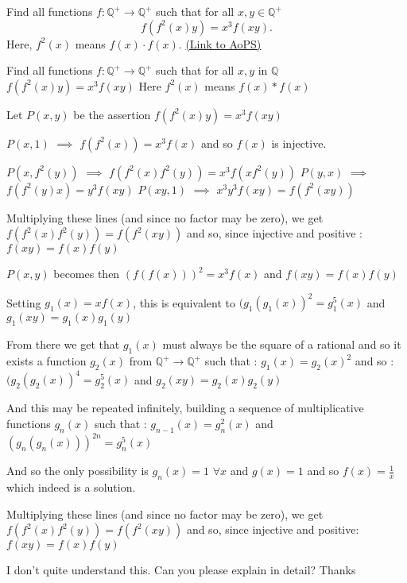 \begin{problem}
	Find all functions $f:\mathbb{Q}^{+}\to\mathbb{Q}^{+}$ such that for all $x,y \in \mathbb{Q}^+$
\[ f(f^{2}(x)y)=x^{3}f(xy).\]
Here, $ f^{2}(x) $ means $ f(x) \cdot f(x) $.
	\flushright \href{https://artofproblemsolving.com/community/c6h412941}{(Link to AoPS)}
\end{problem}



\begin{solution}
	\begin{tcolorbox}Find all functions $f:\mathbb{Q}^{+}\to\mathbb{Q}^{+}$ such that for all $x,y$ in $\mathbb{Q}$
$ f(f^{2}(x)y)=x^{3}f(xy) $
Here $ f^{2}(x) $ means $ f(x)*f(x) $\end{tcolorbox}
Let $P(x,y)$ be the assertion $f(f^2(x)y)=x^3f(xy)$

$P(x,1)$ $\implies$ $f(f^2(x))=x^3f(x)$ and so $f(x)$ is injective.

$P(x,f^2(y))$ $\implies$ $f(f^2(x)f^2(y))=x^3f(xf^2(y))$
$P(y,x)$ $\implies$ $f(f^2(y)x)=y^3f(xy)$
$P(xy,1)$ $\implies$ $x^3y^3f(xy)=f(f^2(xy))$

Multiplying these lines (and since no factor may be zero), we get $f(f^2(x)f^2(y))=f(f^2(xy))$ and so, since injective and positive :
$f(xy)=f(x)f(y)$

$P(x,y)$ becomes then $(f(f(x)))^2=x^3f(x)$ and $f(xy)=f(x)f(y)$

Setting $g_1(x)=xf(x)$, this is equivalent to $(g_1(g_1(x))^2=g_1^5(x)$ and $g_1(xy)=g_1(x)g_1(y)$

From there we get that $g_1(x)$ must always be the square of a rational and so it exists a function $g_2(x)$ from $\mathbb Q^+\to\mathbb Q^+$ such that :
$g_1(x)=g_2(x)^2$ and so :
$(g_2(g_2(x))^4=g_2^{5}(x)$ and $g_2(xy)=g_2(x)g_2(y)$

And this may be repeated infinitely, building a sequence of multiplicative functions $g_n(x)$ such that :
$g_{n-1}(x)=g_{n}^2(x)$ and $(g_n(g_n(x)))^{2n}=g_n^5(x)$

And so the only possibility is $g_n(x)=1$ $\forall x$ and $g(x)=1$ and so $\boxed{f(x)=\frac 1x}$ which indeed is a solution.
\end{solution}



\begin{solution}
	\begin{tcolorbox}Multiplying these lines (and since no factor may be zero), we get $ f(f^{2}(x)f^{2}(y))=f(f^{2}(xy)) $
 and so, since injective and positive: $f(xy)=f(x)f(y)$
\end{tcolorbox}
I don't quite understand this. Can you please explain in detail?
Thanks
\end{solution}



